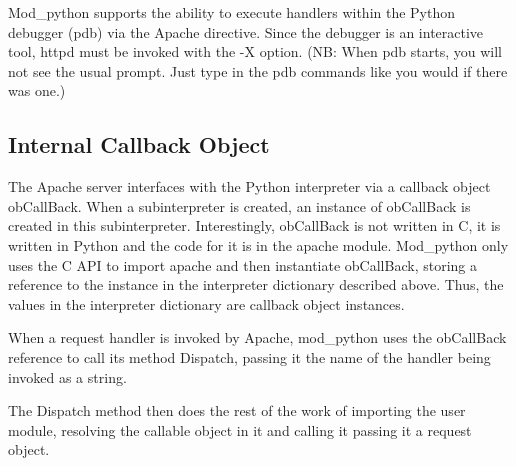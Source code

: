 Mod_python supports the ability to execute handlers within the Python
debugger (pdb) via the  Apache directive. Since
the debugger is an interactive tool, httpd must be invoked with the -X
option. (NB: When pdb starts, you will not see the usual \code{>>>}
prompt. Just type in the pdb commands like you would if there was
one.)

\subsection{Internal Callback Object\label{pyapi-callback}}

The Apache server interfaces with the Python interpreter via a
callback object obCallBack. When a subinterpreter is created, an
instance of obCallBack is created in this
subinterpreter. Interestingly, obCallBack is not written in C, it is
written in Python and the code for it is in the apache module.
Mod_python only uses the C API to import apache and then instantiate
obCallBack, storing a reference to the instance in the interpreter
dictionary described above. Thus, the values in the interpreter
dictionary are callback object instances.

When a request handler is invoked by Apache, mod_python uses the
obCallBack reference to call its method Dispatch, passing it the name
of the handler being invoked as a string.
            
The Dispatch method then does the rest of the work of importing the
user module, resolving the callable object in it and calling it
passing it a request object.
